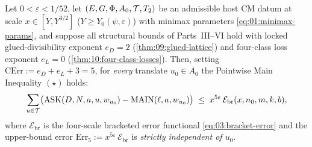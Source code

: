 \begin{theorem}
\label{thm:06:main-ineq-star}
Let $0 < \varepsilon < 1/52$, let $(E, G, \Phi, A_0, \mathcal{T}, T_2)$ be an admissible host CM datum at scale $x \in [Y, Y^{3/2}]$ ($Y \ge Y_0(\psi, \varepsilon)$) with minimax parameters \eqref{eq:01:minimax-params}, and suppose all structural bounds of Parts~III--VI hold with locked glued-divisibility exponent $e_D = 2$ (\cref{thm:09:glued-lattice}) and four-class loss exponent $e_L = 0$ (\cref{thm:10:four-class-losses}). Then, setting $\mathrm{CErr} := e_D + e_L + 3 = 5$, for \emph{every} translate $u_0 \in A_0$ the Pointwise Main Inequality $(\star)$ holds:
\begin{equation}
\label{eq:06:main-ineq-star}
  \sum_{u \in \mathcal{T}} \bigl(\mathrm{ASK}(D, N, a, u, w_{u_0}) - \mathrm{MAIN}(\ell, a, w_{u_0})\bigr)
  \;\le\; x^{5\varepsilon}\,\mathcal{E}_{\mathrm{br}}(x, n_0, m, k, b),
\end{equation}
where $\mathcal{E}_{\mathrm{br}}$ is the four-scale bracketed error functional \eqref{eq:03:bracket-error} and the upper-bound error $\mathrm{Err}_5 := x^{5\varepsilon}\,\mathcal{E}_{\mathrm{br}}$ is \emph{strictly independent of $u_0$}.
\end{theorem}


